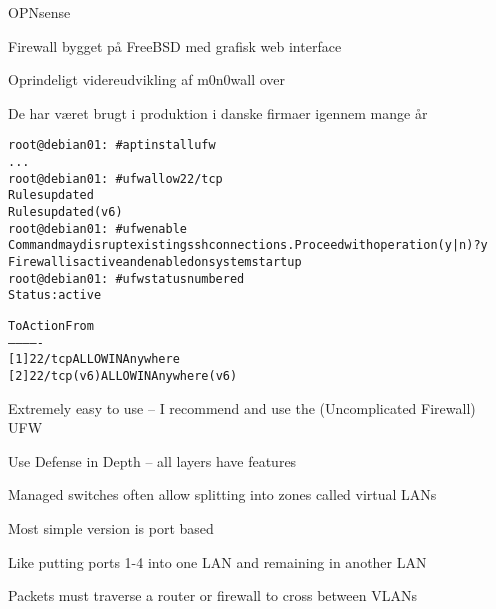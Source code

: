 \documentclass[Screen16to9,17pt]{foils}
\begin{document}


\begin{list1}
\item OPNsense 
\item Firewall bygget på FreeBSD med grafisk web interface
\item Oprindeligt videreudvikling af m0n0wall over \\
\item De har været brugt i produktion i danske firmaer igennem mange år
\end{list1}



\begin{alltt}\small
root@debian01:~# apt install ufw
...
root@debian01:~# ufw allow 22/tcp
Rules updated
Rules updated (v6)
root@debian01:~# ufw enable
Command may disrupt existing ssh connections. Proceed with operation (y|n)? y
Firewall is active and enabled on system startup
root@debian01:~# ufw status numbered
Status: active

     To                         Action      From
     --                         ------      ----
[ 1] 22/tcp                     ALLOW IN    Anywhere
[ 2] 22/tcp (v6)                ALLOW IN    Anywhere (v6)
\end{alltt}

\begin{list2}
\item Extremely easy to use -- I recommend and use the (Uncomplicated Firewall) UFW
\end{list2}



\centerline{Use Defense in Depth -- all layers have features}






\begin{list1}
\item Managed switches often allow splitting into zones called virtual LANs
\item Most simple version is port based
\item Like putting ports 1-4 into one LAN and remaining in another LAN
\item Packets must traverse a router or firewall to cross between VLANs
\end{list1}
\end{document}
